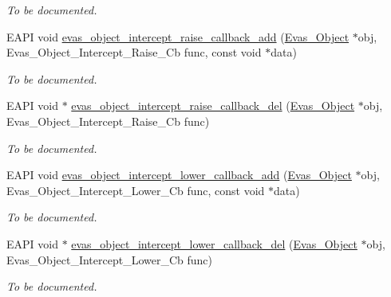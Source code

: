 \begin{DoxyCompactItemize}
\begin{DoxyCompactList}\small\item\em To be documented. \item\end{DoxyCompactList}\item 
EAPI void \hyperlink{group__Evas__Object__Group__Interceptors_ga19d34b7aeb38e7461ffd4edbe53ed6de}{evas\_\-object\_\-intercept\_\-raise\_\-callback\_\-add} (\hyperlink{group__Evas__Object__Group_ga9e19e6dd1f517a0ba437c0114d3e7c97}{Evas\_\-Object} $\ast$obj, Evas\_\-Object\_\-Intercept\_\-Raise\_\-Cb func, const void $\ast$data)
\begin{DoxyCompactList}\small\item\em To be documented. \item\end{DoxyCompactList}\item 
EAPI void $\ast$ \hyperlink{group__Evas__Object__Group__Interceptors_ga506306fe87e6029c05900aa1d05f7738}{evas\_\-object\_\-intercept\_\-raise\_\-callback\_\-del} (\hyperlink{group__Evas__Object__Group_ga9e19e6dd1f517a0ba437c0114d3e7c97}{Evas\_\-Object} $\ast$obj, Evas\_\-Object\_\-Intercept\_\-Raise\_\-Cb func)
\begin{DoxyCompactList}\small\item\em To be documented. \item\end{DoxyCompactList}\item 
EAPI void \hyperlink{group__Evas__Object__Group__Interceptors_ga89af0b657cf6455d5f045a8635bda384}{evas\_\-object\_\-intercept\_\-lower\_\-callback\_\-add} (\hyperlink{group__Evas__Object__Group_ga9e19e6dd1f517a0ba437c0114d3e7c97}{Evas\_\-Object} $\ast$obj, Evas\_\-Object\_\-Intercept\_\-Lower\_\-Cb func, const void $\ast$data)
\begin{DoxyCompactList}\small\item\em To be documented. \item\end{DoxyCompactList}\item 
EAPI void $\ast$ \hyperlink{group__Evas__Object__Group__Interceptors_gabf2007804911fba837d08f40771b4407}{evas\_\-object\_\-intercept\_\-lower\_\-callback\_\-del} (\hyperlink{group__Evas__Object__Group_ga9e19e6dd1f517a0ba437c0114d3e7c97}{Evas\_\-Object} $\ast$obj, Evas\_\-Object\_\-Intercept\_\-Lower\_\-Cb func)
\begin{DoxyCompactList}\small\item\em To be documented. \item\end{DoxyCompactList}\item 

\end{DoxyCompactItemize}
